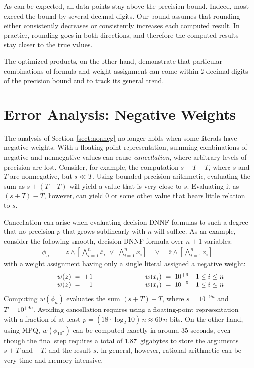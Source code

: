 \documentclass[letterpaper,USenglish,cleveref, autoref, thm-restate]{lipics-v2021}
\newcommand{\obar}[1]{\overline{#1}}
\begin{document}
As can
be expected, all data points stay above the precision bound.  Indeed,
most exceed the bound by several decimal digits.  Our bound assumes
that rounding either consistently decreases or consistently
increases each computed result.  In practice, rounding goes in both directions, and
therefore the computed results stay closer to the true values.

The optimized products, on the other hand, demonstrate that particular
combinations of formula and weight assignment can come within 2 decimal digits of the
precision bound and to track its general trend.

\section{Error Analysis: Negative Weights}
\label{sect:neg}

The analysis of Section~\ref{sect:nonneg} no longer holds when
some literals have negative weights.  With a floating-point
representation, summing combinations of negative and nonnegative
values can cause \emph{cancellation}, where arbitrary levels of
precision are lost.  Consider, for example, the computation
$s + T - T$, where $s$ and $T$ are nonnegative, but $s \ll T$.  Using
bounded-precision arithmetic, evaluating the sum as $s + (T - T)$ will yield a value
that is very close to $s$.
Evaluating it as $(s + T) - T$, however, can yield $0$ or some other value that bears little relation to $s$.

Cancellation can arise when evaluating decision-DNNF formulas to such a degree that no precision $p$ that grows sublinearly with $n$ will suffice.
As an example, consider the following smooth, decision-DNNF formula over $n+1$ variables:
\begin{eqnarray}
\phi_n  & = & z \land \left[\bigwedge_{i = 1}^{n} \obar{x}_i \; \lor \; \bigwedge_{i = 1}^{n} x_i\right] \quad \lor \quad \obar{z} \land \left [\bigwedge_{i = 1}^{n} x_i\right] \label{eqn:max:precision}
\end{eqnarray}
with a weight assignment having only a single literal assigned a negative weight:
\begin{displaymath}
\begin{array}{lllll}
\makebox[1cm]{} &  w(z) \; = \; +1 & \makebox[2cm]{} &  w(x_i) \; = \; 10^{+9} & 1 \leq i \leq n \\
\makebox[1cm]{} &  w(\obar{z}) \; = \; -1 & &  w(\obar{x}_i) \; = \; 10^{-9} & 1 \leq i \leq n \\
\end{array}
\end{displaymath}
Computing $w(\phi_n)$  evaluates the sum $(s + T) - T$, where
$s = 10^{-9n}$ and $T = 10^{+9n}$.  Avoiding cancellation requires using a floating-point representation with a fraction of at least
$p = (18 \cdot \log_2 10)\, n \approx 60 \, n$ bits.
On the other hand, using MPQ, $w(\phi_{10^7})$ can be computed exactly in around 35 seconds, even though the final step requires a total of 1.87~gigabytes to store the arguments
$s+T$ and $-T$, and the result $s$.  In general, however, rational arithmetic can be very time and memory intensive.
\end{document}
